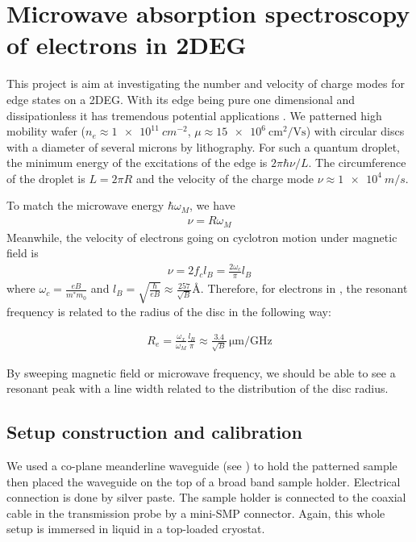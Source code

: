 \documentclass[12pt]{ruthesis}
\begin{document}
\chapter{Microwave absorption spectroscopy of electrons in 2DEG}\label{Absorption}

This project is aim at investigating the number and velocity of charge modes for edge states on a 2DEG.
With its edge being pure one dimensional and dissipationless it has tremendous potential applications \cite{PhysRevB.88.165305}.
We patterned high mobility  wafer ($n_{e} \approx \SI{1e11}{cm^{-2}}$, $\mu \approx \SI{15 e6}{\cm^{2}/\volt \second}$) with circular discs with a diameter of several microns by lithography. 
For such a quantum droplet, the minimum energy of the excitations of the edge is $2\pi \hbar \nu /L$. 
The circumference of the droplet is $L=2\pi R$ and the velocity of the charge mode $\nu \approx \SI{1e4}{m/s}$.

To match the microwave energy $\hbar \omega_{M}$, we have 
\begin{align}
\nu = R \omega_{M}
\end{align}
Meanwhile, the velocity of electrons going on cyclotron motion under magnetic field is 
\begin{align}
\nu = 2 f_{c} l_{B}= \frac{2 \omega_{c}}{\pi} l_{B} 
\end{align}
where $\displaystyle \omega_{c}= \frac{eB}{m^{\ast}m_{0}}$ and $\displaystyle l_{B}=\sqrt{\frac{\hbar}{eB}} \approx \frac{257}{\sqrt{B}} \si{\angstrom}$.
Therefore, for electrons in , the resonant frequency is related to the radius of the disc in the following way:

\begin{align}
R_{e}= \frac{\omega_{x}}{\omega_{M}} \frac{l_{B}}{\pi} \approx \frac{3.4}{\sqrt{B}} \, \si{\micro\meter/\giga\hertz}
\end{align}

By sweeping magnetic field or microwave frequency, we should be able to see a resonant peak with a line width related to the distribution of the disc radius. 


\section{Setup construction and calibration}\label{Construction}

We used a co-plane meanderline waveguide (see \cite{APLBroadbandESR}) to hold the patterned sample then placed the waveguide on the top of a broad band sample holder.
Electrical connection is done by silver paste.  
The sample holder is connected to the coaxial cable in the transmission probe by a mini-SMP connector.
Again, this whole setup is immersed in  liquid in a top-loaded cryostat.
\end{document}
